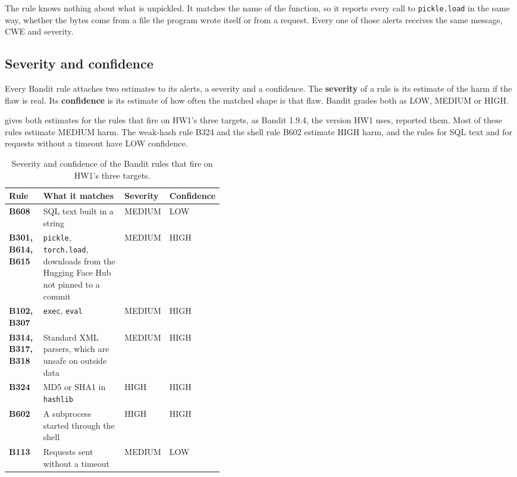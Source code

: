The rule knows nothing about what is unpickled. It matches the name of the function, so it reports
every call to \texttt{pickle.load} in the same way, whether the bytes come from a file the program
wrote itself or from a request. Every one of those alerts receives the same message, CWE and
severity.

\subsection{Severity and confidence}
\label{sec:triage-severity}

Every Bandit rule attaches two estimates to its alerts, a severity and a confidence. The
\textbf{severity} of a rule is its estimate of the harm if the flaw is real. Its
\textbf{confidence} is its estimate of how often the matched shape is that flaw. Bandit grades both
as LOW, MEDIUM or HIGH.

 gives both estimates for the rules that fire on HW1's three targets, as
Bandit 1.9.4, the version HW1 uses, reported them. Most of these rules estimate MEDIUM harm. The
weak-hash rule B324 and the shell rule B602 estimate HIGH harm, and the rules for SQL text and for
requests without a timeout have LOW confidence.

\begin{table}[t]
  \caption{Severity and confidence of the Bandit rules that fire on HW1's three targets.}
  \label{tab:triage-severity}
  \begin{adjustbox}{width=\linewidth}\begin{tabularx}{\linewidth}{L{0.16\linewidth}XL{0.13\linewidth}L{0.13\linewidth}}
    \toprule
    \textbf{Rule} & \textbf{What it matches} & \textbf{Severity} & \textbf{Confidence} \\
    \midrule
    \textbf{B608} & SQL text built in a string & MEDIUM & LOW \\
    \textbf{B301, B614, B615} & \texttt{pickle}, \texttt{torch.load}, downloads from the Hugging Face Hub not pinned to a commit & MEDIUM & HIGH \\
    \textbf{B102, B307} & \texttt{exec}, \texttt{eval} & MEDIUM & HIGH \\
    \textbf{B314, B317, B318} & Standard XML parsers, which are unsafe on outside data & MEDIUM & HIGH \\
    \textbf{B324} & MD5 or SHA1 in \texttt{hashlib} & HIGH & HIGH \\
    \textbf{B602} & A subprocess started through the shell & HIGH & HIGH \\
    \textbf{B113} & Requests sent without a timeout & MEDIUM & LOW \\
    \bottomrule
  \end{tabularx}\end{adjustbox}
\end{table}

